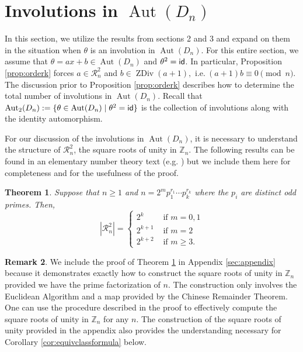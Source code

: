 \documentclass[12pt]{amsart}
\numberwithin{equation}{section}
\newtheorem{theorem}{Theorem}[section]
\theoremstyle{definition}
\newtheorem{remark}[theorem]{Remark}
\newcommand{\Aut}{\operatorname{Aut}}
\newcommand{\Z}{\mathbb{Z}}
\newcommand{\zdiv}[1]{{\operatorname{ZDiv}(#1)}}
\renewcommand{\Z}{\mathbb{Z}}
\begin{document}
\section{Involutions in $\Aut(D_n)$}
\label{sec:results-invol}

In this section, we utilize the results from sections 2 and 3 and expand
on them in the situation when $\theta$ is an involution in $\Aut(D_n)$.
For this entire section, we assume that $\theta=ax+b\in\Aut(D_n)$ and
$\theta^2={\sf id}$. In particular, Proposition \ref{prop:orderk} forces
$a\in\mathcal{R}_n^2$ and $b\in\zdiv{a+1},
\mbox{ i.e.}\ (a+1)b\equiv 0\pmod{n}$. The discussion prior to Proposition
\ref{prop:orderk} describes how to determine the total number of involutions
in $\Aut(D_n)$. Recall that $\Aut_2(D_n):=\{\theta\in\Aut(D_n)\mid
\theta^2={\sf id}\}$ is the collection of involutions along with the identity automorphism.

For our discussion of the involutions in $\Aut(D_n)$, it
is necessary to understand the structure of $\mathcal{R}_n^2$, the square
roots of unity in $\Z_n$. The following results can be found in an
elementary number theory text (e.g.  \cite[Example 3.18]{Jones-Jones})
but we include them here for completeness and for the usefulness of the
proof.

\begin{theorem}
\label{thm:squareroots1}
Suppose that $n\geq 1$ and $n=2^mp_1^{r_1}\cdots p_k^{r_k}$ where the $p_i$ are distinct odd primes. Then,
$$|\mathcal{R}_n^2|=\begin{cases}
2^k & \mbox{ if $m=0,1$}\\
2^{k+1} & \mbox{ if $m=2$}\\
2^{k+2} & \mbox{ if $m\geq 3$}.
\end{cases}$$
\end{theorem}

\begin{remark}
\label{rmk:computesqr}
We include the proof of Theorem \ref{thm:squareroots1} in Appendix \ref{sec:appendix} because it demonstrates
exactly how to construct the square roots of unity in $\Z_n$ provided we have
the prime factorization of $n$. The construction only involves the 
Euclidean Algorithm and a map provided by the Chinese Remainder
Theorem. One can use the procedure described in the proof to
effectively compute the square roots of unity in $\Z_n$ for any $n$. The construction of the square roots of unity provided in the appendix also provides the understanding necessary for Corollary \ref{cor:equivclassformula} below.
\end{remark}
\end{document}
